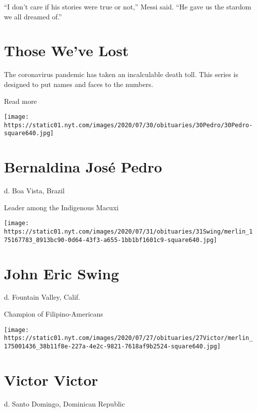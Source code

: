 ``I don't care if his stories were true or not,'' Messi said. ``He gave
us the stardom we all dreamed of.''

\href{https://www.nytimes.com/interactive/2020/obituaries/people-died-coronavirus-obituaries.html?action=click\&pgtype=Article\&state=default\&region=BELOW_MAIN_CONTENT\&context=covid_obits_promo}{}

\hypertarget{those-weve-lost}{%
\section{Those We've Lost}\label{those-weve-lost}}

The coronavirus pandemic has taken an incalculable death toll. This
series is designed to put names and faces to the numbers.

Read more

\texttt{[image: https://static01.nyt.com/images/2020/07/30/obituaries/30Pedro/30Pedro-square640.jpg]}

\hypertarget{bernaldina-josuxe9-pedro}{%
\section{Bernaldina José Pedro}\label{bernaldina-josuxe9-pedro}}

d. Boa Vista, Brazil

Leader among the Indigenous Macuxi

\texttt{[image: https://static01.nyt.com/images/2020/07/31/obituaries/31Swing/merlin\_175167783\_8913bc90-0d64-43f3-a655-1bb1bf1601c9-square640.jpg]}

\hypertarget{john-eric-swing}{%
\section{John Eric Swing}\label{john-eric-swing}}

d. Fountain Valley, Calif.

Champion of Filipino-Americans

\texttt{[image: https://static01.nyt.com/images/2020/07/27/obituaries/27Victor/merlin\_175001436\_38b11f8e-227a-4e2c-9821-7618af9b2524-square640.jpg]}

\hypertarget{victor-victor}{%
\section{Victor Victor}\label{victor-victor}}

d. Santo Domingo, Dominican Republic

